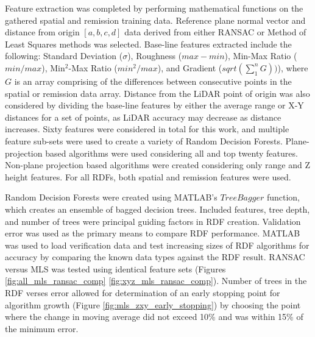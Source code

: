 \documentclass[journal,onecolumn]{IEEEtran}
\begin{document}
	{Feature extraction was completed by performing mathematical functions on the gathered spatial and remission training data. Reference plane normal vector and distance from origin $[a,b,c,d]$ data derived from either RANSAC or Method of Least Squares methods was selected. Base-line features extracted include the following: Standard Deviation ($\sigma$), Roughness ($max - min$), Min-Max Ratio ($min / max$), Min$^{2}$-Max Ratio ($min^2 / max$), and Gradient ($sqrt(\sum_{1}^{n} G))$), where $G$ is an array comprising of the differences between consecutive points in the spatial or remission data array. Distance from the LiDAR point of origin was also considered by dividing the base-line features by either the average range or X-Y distances for a set of points, as LiDAR accuracy may decrease as distance increases. Sixty features were considered in total for this work, and multiple feature sub-sets were used to create a variety of Random Decision Forests. Plane-projection based algorithms were used considering all and top twenty features. Non-plane projection based algorithms were created considering only range and Z height features. For all RDFs, both spatial and remission features were used.} 
	
	{Random Decision Forests were created using MATLAB's $TreeBagger$ function, which creates an ensemble of bagged decision trees. Included features, tree depth, and number of trees were principal guiding factors in RDF creation. Validation error was used as the primary means to compare RDF performance. MATLAB was used to load verification data and test increasing sizes of RDF algorithms for accuracy by comparing the known data types against the RDF result. RANSAC versus MLS was tested using identical feature sets (Figures \ref{fig:all_mls_ransac_comp} \ref{fig:xyz_mls_ransac_comp}). Number of trees in the RDF verses error allowed for determination of an early stopping point for algorithm growth (Figure \ref{fig:mls_zxy_early_stopping}) by choosing the point where the change in moving average did not exceed 10\% and was within 15\% of the minimum error.}
	
\end{document}
